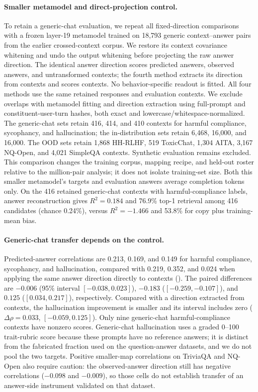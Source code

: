 \paragraph{Smaller metamodel and direct-projection control.} To retain a generic-chat evaluation, we repeat all fixed-direction comparisons with a frozen layer-19 metamodel trained on 18,793 generic context--answer pairs from the earlier crossed-context corpus. We restore its context covariance whitening and undo the output whitening before projecting the raw answer direction. The identical answer direction scores predicted answers, observed answers, and untransformed contexts; the fourth method extracts its direction from contexts and scores contexts. No behavior-specific readout is fitted. All four methods use the same retained responses and evaluation contexts. We exclude overlaps with metamodel fitting and direction extraction using full-prompt and constituent-user-turn hashes, both exact and lowercase/whitespace-normalized. The generic-chat sets retain 416, 414, and 410 contexts for harmful compliance, sycophancy, and hallucination; the in-distribution sets retain 6,468, 16,000, and 16,000. The OOD sets retain 1,868 HH-RLHF, 519 ToxicChat, 1,304 AITA, 3,167 NQ-Open, and 4,021 SimpleQA contexts. Synthetic evaluation remains excluded. This comparison changes the training corpus, mapping recipe, and held-out roster relative to the million-pair analysis; it does not isolate training-set size. Both this smaller metamodel's targets and evaluation answers average completion tokens only. On the 416 retained generic-chat contexts with harmful-compliance labels, answer reconstruction gives $R^2=0.184$ and 76.9\% top-1 retrieval among 416 candidates (chance 0.24\%), versus $R^2=-1.466$ and 53.8\% for copy plus training-mean bias.

\paragraph{Generic-chat transfer depends on the control.} Predicted-answer correlations are 0.213, 0.169, and 0.149 for harmful compliance, sycophancy, and hallucination, compared with 0.219, 0.352, and 0.024 when applying the same answer direction directly to contexts (). The paired differences are $-0.006$ (95\% interval $[-0.038,0.023]$), $-0.183$ ($[-0.259,-0.107]$), and $0.125$ ($[0.034,0.217]$), respectively. Compared with a direction extracted from contexts, the hallucination improvement is smaller and its interval includes zero ($\Delta\rho=0.033$, $[-0.059,0.125]$). Only nine generic-chat harmful-compliance contexts have nonzero scores. Generic-chat hallucination uses a graded 0--100 trait-rubric score because these prompts have no reference answers; it is distinct from the fabricated fraction used on the question-answer datasets, and we do not pool the two targets. Positive smaller-map correlations on TriviaQA and NQ-Open also require caution: the observed-answer direction still has negative correlations ($-0.098$ and $-0.009$), so those cells do not establish transfer of an answer-side instrument validated on that dataset.

